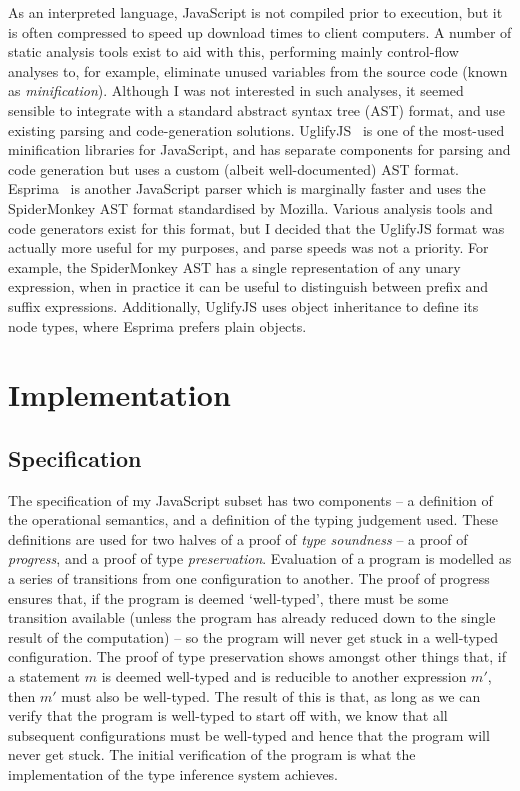 \documentclass[12pt,a4paper,twoside,openright]{report}
\begin{document}
As an interpreted language, JavaScript is not compiled prior to execution, but
it is often compressed to speed up download times to client computers. A number
of static analysis tools exist to aid with this, performing mainly control-flow
analyses to, for example, eliminate unused variables from the source code
(known as \textit{minification}). Although I was not interested in such
analyses, it seemed sensible to integrate with a standard abstract syntax tree
(AST) format, and use existing parsing and code-generation solutions.
UglifyJS~\cite{uglify} is one of the most-used minification libraries for
JavaScript, and has separate components for parsing and code generation but
uses a custom (albeit well-documented) AST format. Esprima~\cite{esprima} is
another JavaScript parser which is marginally faster and uses the SpiderMonkey
AST format standardised by Mozilla. Various analysis tools and code generators
exist for this format, but I decided that the UglifyJS format was actually more
useful for my purposes, and parse speeds was not a priority. For example, the
SpiderMonkey AST has a single representation of any unary expression, when in
practice it can be useful to distinguish between prefix and suffix expressions.
Additionally, UglifyJS uses object inheritance to define its node types, where
Esprima prefers plain objects. 

\chapter{Implementation}\label{implementation}

\section{Specification} The specification of my JavaScript subset has two
components -- a definition of the operational semantics, and a definition of
the typing judgement used. These definitions are used for two halves of a proof
of \textit{type soundness} -- a proof of \textit{progress}, and a proof of type
\textit{preservation}.  Evaluation of a program is modelled as a series of
transitions from one configuration to another. The proof of progress ensures
that, if the program is deemed `well-typed', there must be some transition
available (unless the program has already reduced down to the single result of
the computation) -- so the program will never get stuck in a well-typed
configuration. The proof of type preservation shows amongst other things that,
if a statement $m$ is deemed well-typed and is reducible to another expression
$m'$, then $m'$ must also be well-typed. The result of this is that, as long as
we can verify that the program is well-typed to start off with, we know that
all subsequent configurations must be well-typed and hence that the program
will never get stuck. The initial verification of the program is what the
implementation of the type inference system achieves.
\end{document}
